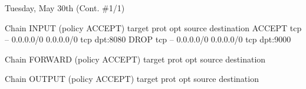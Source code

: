 \documentclass[11pt]{article}
\begin{document}
\newpage
\begin{bloodorangebox}{Tuesday, May 30th (Cont. \#1/1)\vspace{-2.2em}\begin{flushright}\large{}\end{flushright}}
\begin{ubuntu}
Chain INPUT (policy ACCEPT)
target     prot opt source               destination         
ACCEPT     tcp  --  0.0.0.0/0            0.0.0.0/0            tcp dpt:8080
DROP       tcp  --  0.0.0.0/0            0.0.0.0/0            tcp dpt:9000

Chain FORWARD (policy ACCEPT)
target     prot opt source               destination         

Chain OUTPUT (policy ACCEPT)
target     prot opt source               destination    
\end{ubuntu}


\end{bloodorangebox}
\end{document}
